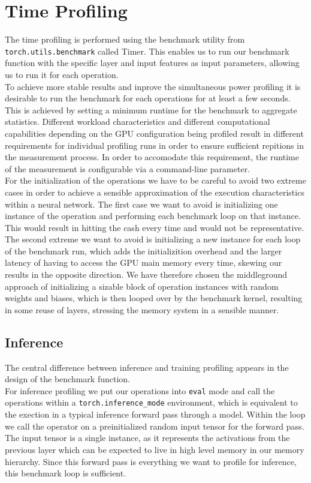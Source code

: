 \section{Time Profiling}



The time profiling is performed using the benchmark utility from \texttt{torch.utils.benchmark} called Timer. This enables us to run our benchmark function with the specific layer and input features as input parameters, allowing us to run it for each operation. \\
To achieve more stable results and inprove the simultaneous power profiling it is desirable to run the benchmark for each operations for at least a few seconds. This is achieved by setting a minimum runtime for the benchmark to aggregate statistics. Different workload characteristics and different computational capabilities depending on the GPU configuration being profiled result in different requirements for individual profiling runs in order to ensure sufficient repitions in the measurement process. In order to accomodate this requirement, the runtime of the measurement is configurable via a command-line parameter. \\
For the initialization of the operations we have to be careful to avoid two extreme cases in order to achieve a sensible approximation of the execution characteristics within a neural network. The first case we want to avoid is initializing one instance of the operation and performing each benchmark loop on that instance. This would result in hitting the cash every time and would not be representative. The second extreme we want to avoid is initializing a new instance for each loop of the benchmark run, which adds the initializition overhead and the larger latency of having to access the GPU main memory every time, skewing our results in the opposite direction. We have therefore chosen the middleground approach of initializing a sizable block of operation instances with random weights and biases, which is then looped over by the benchmark kernel, resulting in some reuse of layers, stressing the memory system in a sensible manner. \\


\subsection{Inference}
The central difference between inference and training profiling appears in the design of the benchmark function. \\
For inference profiling we put our operations into \texttt{eval} mode and call the operations within a \texttt{torch.inference\_mode} environment, which is equivalent to the exection in a typical inference forward pass through a model. Within the loop we call the operator on a preinitialized random input tensor for the forward pass. The input tensor is a single instance, as it represents the activations from the previous layer which can be expected to live in high level memory in our memory hierarchy. Since this forward pass is everything we want to profile for inference, this benchmark loop is sufficient.

